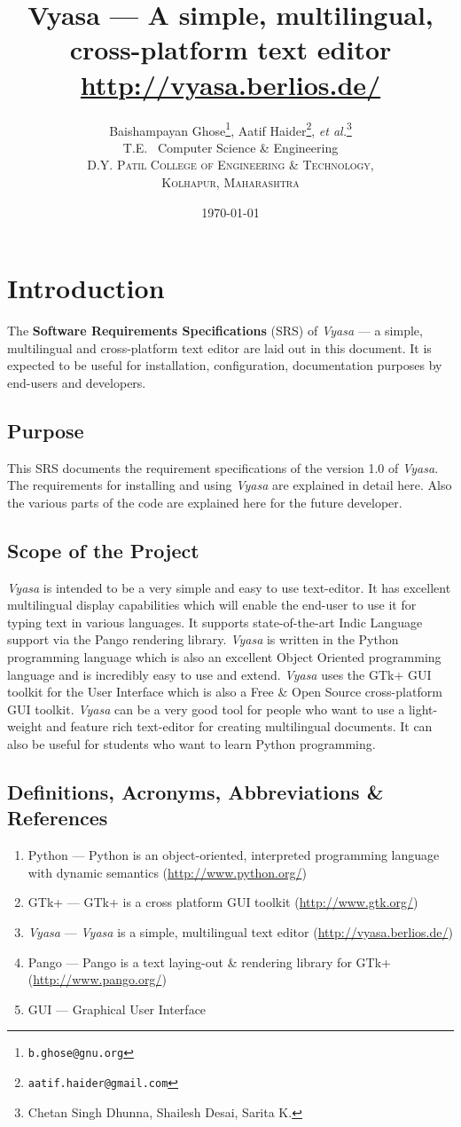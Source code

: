 \documentclass[12pt,a4paper]{article}
\title {Vyasa --- A simple, multilingual, cross-platform text editor \\
  \small{\url{http://vyasa.berlios.de/}}}
\author {\large{Baishampayan Ghose\footnote{\texttt{b.ghose@gnu.org}},
    Aatif Haider\footnote{\texttt{aatif.haider@gmail.com}}, \textit{et
      al.}\footnote{Chetan Singh Dhunna, Shailesh Desai, Sarita K.}}
  \\\small{T.E.~ Computer Science \&{} Engineering}\\ 
\small{\textsc{D.Y. Patil College of Engineering \&{} Technology,}}
\\ \small{\textsc{Kolhapur, Maharashtra}}}
\date{\small{\today}}
\newcommand{\VS}{\textit{Vyasa}}
\begin{document}
\maketitle
\tableofcontents
\listoffigures
\newpage
\section{Introduction}
The {\bfseries Software Requirements Specifications} (SRS) of
\VS{} --- a simple, multilingual and cross-platform text editor
are laid out in this document. It is expected to be useful for
installation, configuration, documentation purposes by end-users and developers.

\subsection{Purpose}
This SRS documents the requirement specifications of the version 1.0 of
\VS. The requirements for installing and using \VS{} are explained in
detail here. Also the various parts of the code are explained here for
the future developer.

\subsection{Scope of the Project}
\VS{} is intended to be a very simple and easy to use text-editor. It
has excellent multilingual display capabilities which will enable the
end-user to use it for typing text in various languages. It supports
state-of-the-art Indic Language support via the Pango rendering
library. \VS{} is written in the Python programming language which is
also an excellent Object Oriented programming language and is incredibly
easy to use and extend. \VS{} uses the GTk+ GUI toolkit for the User
Interface which is also a Free \&{} Open Source cross-platform GUI
toolkit.
\VS{} can be a very good tool for people who want to use a light-weight
and feature rich text-editor for creating multilingual documents. It can
also be useful for students who want to learn Python programming.

\subsection{Definitions, Acronyms, Abbreviations \&{} References}
\begin{enumerate}
\item Python --- Python is an object-oriented, interpreted programming
  language with dynamic semantics (\url{http://www.python.org/})
\item GTk+ --- GTk+ is a cross platform GUI toolkit (\url{http://www.gtk.org/})
\item \VS{} --- \VS{} is a simple, multilingual text editor
  (\url{http://vyasa.berlios.de/})
\item Pango --- Pango is a text laying-out \&{} rendering library for
  GTk+ (\url{http://www.pango.org/})
\item GUI --- Graphical User Interface
\end{enumerate}
\end{document}
